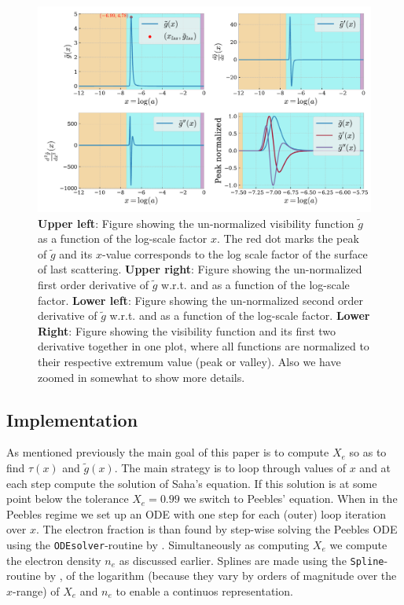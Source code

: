 \documentclass[twocolumn]{aastex62}
\begin{document}
\begin{figure}
    \includegraphics[scale = 0.65]{Figures/g_tilde.pdf}
    \caption{\textbf{Upper left}: Figure showing the un-normalized visibility function $\tilde{g}$ as a function of the log-scale factor $x$.
    The red dot marks the peak of $\tilde{g}$ 
    and its $x$-value corresponds to the log scale factor of the surface of last scattering. 
    \textbf{Upper right}: Figure showing the un-normalized first order derivative of $\tilde{g}$ w.r.t. and as a function of the log-scale factor. 
    \textbf{Lower left}: Figure showing the un-normalized second order derivative of $\tilde{g}$ w.r.t. and as a function of the log-scale factor.
    \textbf{Lower Right}: Figure showing the visibility function and its first two derivative together in one plot, where all functions are normalized to their respective extremum value (peak or valley). Also we have zoomed in somewhat to show more details.
    }
    \label{fig:g_tilde}
\end{figure}

\subsection{Implementation}\label{subsec:implementation}
As mentioned previously the main goal of this paper is to compute $X_e$ so as to find $\tau(x)$ and $\tilde{g}(x)$. The main strategy is to loop through values of $x$ and at each step compute the solution of Saha's equation. If this solution is at some point below the tolerance $X_e = 0.99$ we switch to Peebles' equation. When in the Peebles regime we set up an ODE with one step for each (outer) loop iteration over $x$. The electron fraction is than found by step-wise solving the Peebles ODE using the \texttt{ODEsolver}-routine by \cite{winther:2020}. Simultaneously as computing $X_e$ we compute the electron density $n_e$ as discussed earlier. Splines are made using the \texttt{Spline}-routine by \cite{winther:2020}, of the logarithm (because they vary by orders of magnitude over the $x$-range) of $X_e$ and $n_e$ to enable a continuos representation.
\end{document}
